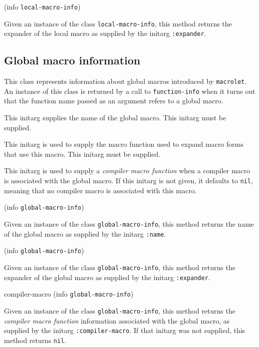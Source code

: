  {(info {\tt local-macro-info})}

Given an instance of the class \texttt{local-macro-info}, this
method returns the expander of the local macro as supplied by the
initarg \texttt{:expander}.

\subsection{Global macro information}


This class represents information about global macros introduced by
\texttt{macrolet}.  An instance of this class is returned by a call to
\texttt{function-info} when it turns out that the function name passed
as an argument refers to a global macro.


This initarg supplies the name of the global macro.  This initarg
must be supplied.


This initarg is used to supply the macro function used to expand macro
forms that use this macro.  This initarg must be supplied. 


This initarg is used to supply a \emph{compiler macro function} when
a compiler macro is associated with the global macro.  If this
initarg is not given, it defaults to \texttt{nil}, meaning that no
compiler macro is associated with this macro. 

 {(info {\tt global-macro-info})}

Given an instance of the class \texttt{global-macro-info}, this
method returns the name of the global macro as supplied by the
initarg \texttt{:name}.

 {(info {\tt global-macro-info})}

Given an instance of the class \texttt{global-macro-info}, this
method returns the expander of the global macro as supplied by the
initarg \texttt{:expander}.

\Defmethod compiler-macro {(info {\tt global-macro-info})}

Given an instance of the class \texttt{global-macro-info}, this
method returns the \emph{compiler macro function} information
associated with the global macro, as supplied by the initarg
\texttt{:compiler-macro}.  If that initarg was not supplied, this
method returns \texttt{nil}.

